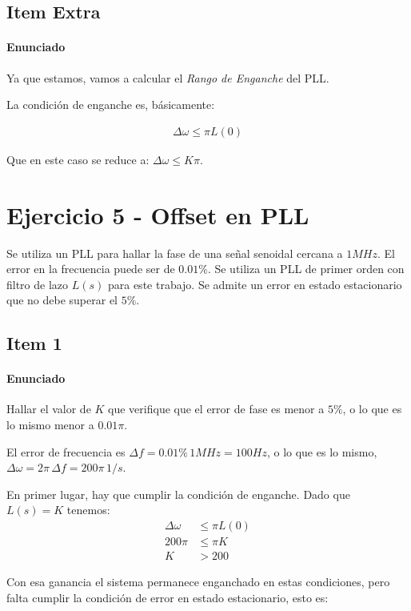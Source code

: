 \subsection{Item Extra} \paragraph{Enunciado} Ya que estamos, vamos a calcular el \textit{Rango de Enganche} del PLL.

La condición de enganche es, básicamente:

\begin{align}
	\Delta\omega \le \pi L(0) \label{ec:rango_enganche}
\end{align}

Que en este caso se reduce a: $\Delta\omega \le K\pi$.

\section{Ejercicio 5 - Offset en PLL}
Se utiliza un PLL para hallar la fase de una señal senoidal cercana a $1MHz$. El error en
la frecuencia puede ser de $0.01\%$. Se utiliza un PLL de primer orden con filtro de lazo $L(s)$
para este trabajo. Se admite un error en estado estacionario que no debe superar el $5\%$.

\subsection{Item 1}
\paragraph{Enunciado} Hallar el valor de $K$ que verifique que el error de fase es menor a $5\%$, o lo que es lo
mismo menor a $0.01\pi$.

El error de frecuencia es $\Delta f = 0.01\%\, 1MHz = 100Hz$, o lo que es lo mismo, $\Delta \omega = 2\pi\, \Delta f = 200\pi\, 1/s$.

En primer lugar, hay que cumplir la condición de enganche. Dado que $L(s) = K$ tenemos:
\begin{align*}
\Delta \omega &\le \pi L(0)\\
200 \pi &\le \pi K\\
K &> 200
\end{align*}

Con esa ganancia el sistema permanece enganchado en estas condiciones, pero falta cumplir la condición de error en estado estacionario, esto es:

